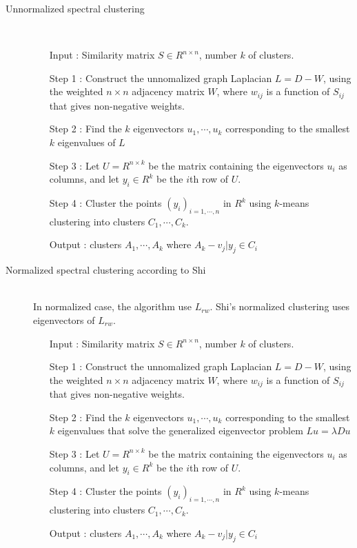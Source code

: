 \begin{description}
\item[Unnormalized spectral clustering] \hfill \\

\begin{enumerate}
\item[Input] : Similarity matrix $S \in R^{n \times n}$, number $k$ of clusters. \\
\item[Step 1] : Construct the unnomalized graph Laplacian $L = D - W$, using the weighted $n \times n$ adjacency matrix $W$, where $w_{ij}$ is a function of $S_{ij}$ that gives non-negative weights. \\
\item[Step 2] : Find the $k$ eigenvectors $u_1, \cdots, u_k$ corresponding to the smallest $k$ eigenvalues of $L$ \\
\item[Step 3] : Let $U = R^{n \times k}$ be the matrix containing the eigenvectors $u_i$ as columns, and let $y_i \in R^k$ be the $i$th row of $U$.\\
\item[Step 4] : Cluster the points $(y_i)_{i=1,\cdots,n}$ in $R^k$ using $k$-means clustering into clusters $C_1,\cdots,C_k$.\\
\item[Output] : clusters $A_1, \cdots, A_k$ where $A_k - {v_j|y_j \in C_i}$
\end{enumerate}

\item[Normalized spectral clustering according to Shi] \hfill \\
In normalized case, the algorithm use $L_{rw}$. Shi's normalized clustering uses eigenvectors of $L_{rw}$.

\begin{enumerate}
\item[Input] : Similarity matrix $S \in R^{n \times n}$, number $k$ of clusters. \\
\item[Step 1] : Construct the unnomalized graph Laplacian $L = D - W$, using the weighted $n \times n$ adjacency matrix $W$, where $w_{ij}$ is a function of $S_{ij}$ that gives non-negative weights. \\
\item[Step 2] : Find the $k$ eigenvectors $u_1, \cdots, u_k$ corresponding to the smallest $k$ eigenvalues that solve the generalized eigenvector problem $L u = \lambda D u$ \\
\item[Step 3] : Let $U = R^{n \times k}$ be the matrix containing the eigenvectors $u_i$ as columns, and let $y_i \in R^k$ be the $i$th row of $U$.\\
\item[Step 4] : Cluster the points $(y_i)_{i=1,\cdots,n}$ in $R^k$ using $k$-means clustering into clusters $C_1,\cdots,C_k$.\\
\item[Output] : clusters $A_1, \cdots, A_k$ where $A_k - {v_j|y_j \in C_i}$
\end{enumerate}


\end{description}
